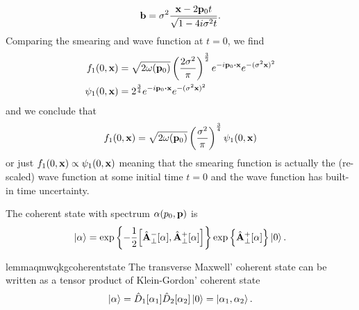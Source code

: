 \begin{example}
\begin{equation*}
		\vb{b}
		=
		\sigma^2
		\frac{\vb{x}-2\vb{p}_0t}{\sqrt{1-4i\sigma^2t}}
		.
	\end{equation*}
	Comparing the smearing and wave function at $t=0$, we find
	\begin{align*}
		f_1(0,\vb{x})
		&=
		\sqrt{2\omega(\vb{p}_0)}
		\left(\frac{2\sigma^2}{\pi}\right)^\frac{3}{2}
		e^{-i\vb{p}_0\vdot\vb{x}}
		e^{-(\sigma^2\vb{x})^2}
		\\
		\psi_1(0,\vb{x})
		&=
		2^\frac{3}{4}
		e^{-i\vb{p}_0\vdot\vb{x}}
		e^{-(\sigma^2\vb{x})^2}
	\end{align*}
	and we conclude that
	\begin{equation*}
		f_1(0,\vb{x})
		=
		\sqrt{2\omega(\vb{p}_0)}
		\left(\frac{\sigma^2}{\pi}\right)^\frac{3}{4}
		\psi_1(0,\vb{x})
	\end{equation*}
	or just $f_1(0,\vb{x})\propto\psi_1(0,\vb{x})$ meaning that the smearing function is actually the (re-scaled) wave function at some initial time $t=0$ and the wave function has built-in time uncertainty.
\end{example}

\begin{definition}
	The coherent state with spectrum $\vb{\alpha}(p_0,\vb{p})$ is
	\begin{equation}
		\label{eq:qmw_coherent_state}
		\begin{split}
			\ket{\vb{\alpha}}
			=
			\exp\left\{
				-
				\frac{1}{2}
				\comm{\hat{\vb{A}}_\perp^-[\vb{\alpha}]}{\hat{\vb{A}}_\perp^+[\vb{\alpha}]}
			\right\}
			\exp\left\{
				\hat{\vb{A}}_\perp^+[\vb{\alpha}]
			\right\}
			\ket{0}
			.
		\end{split}
	\end{equation}
\end{definition}
\begin{restatable}{lemma}{qmwqkgcoherentstate}\label{thm:qmw_qkg_coherent_state}
	The transverse Maxwell' coherent state can be written as a tensor product of Klein-Gordon' coherent state
	\begin{equation}
		\ket{\vb{\alpha}}
		=
		\hat{D}_1[\alpha_1]
		\hat{D}_2[\alpha_2]
		\ket{0}
		=
		\ket{\alpha_1,\alpha_2}
		.
	\end{equation}
\end{restatable}